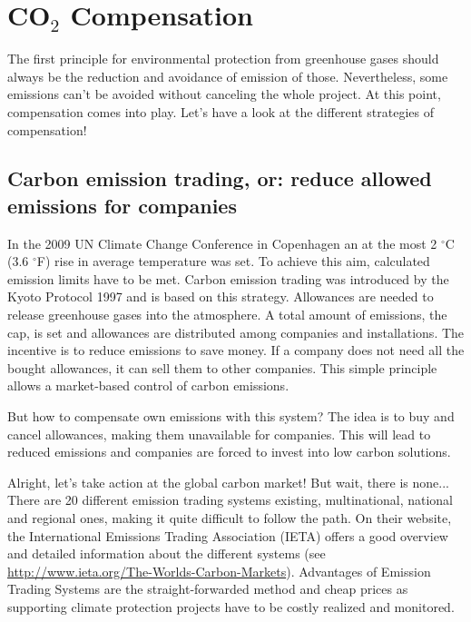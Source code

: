 
\chapter{CO$_\text{2}$ Compensation}\label{chap:compensation}

The first principle for environmental protection from greenhouse gases should always be the reduction and avoidance of emission of those.  Nevertheless, some emissions can't be avoided without canceling the whole project. At this point, compensation comes into play. 
Let's have a look at the different strategies of compensation!

\section{Carbon emission trading, or: reduce allowed emissions for companies} 

In the 2009 UN Climate Change Conference in Copenhagen an at the most 2 $^\circ$C (3.6 $^\circ$F) rise in average temperature was set. To achieve this aim, calculated emission limits have to be met. Carbon emission trading was introduced by the Kyoto Protocol 1997 and is based on this strategy. Allowances are needed to release greenhouse gases into the atmosphere. A total amount of emissions, the cap, is set and allowances are distributed among companies and installations. The incentive is to reduce emissions to save money. If a company does not need all the bought allowances, it can sell them to other companies. This simple principle allows a market-based control of carbon emissions.
\cite{bmub_Emission_Trading}


But how to compensate own emissions with this system? The idea is to buy and cancel allowances, making them unavailable for companies. This will lead to reduced emissions and companies are forced to invest into low carbon solutions. 
\cite{climakind}


Alright, let's take action at the global carbon market! But wait, there is none... There are 20 different emission trading systems existing, multinational, national and regional ones, making it quite difficult to follow the path. On their website, the International Emissions Trading Association (IETA) offers a good overview and detailed information about the different systems (see \url{http://www.ieta.org/The-Worlds-Carbon-Markets}). Advantages of Emission Trading Systems are the straight-forwarded method and cheap prices as supporting climate protection projects have to be costly realized and monitored.


